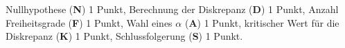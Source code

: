 \begin{bewertung}
Nullhypothese ({\bf N})  1 Punkt,
Berechnung der Diskrepanz ({\bf D}) 1 Punkt,
Anzahl Freiheitsgrade ({\bf F}) 1 Punkt,
Wahl eines $\alpha$ ({\bf A}) 1 Punkt,
kritischer Wert für  die Diskrepanz ({\bf K}) 1 Punkt,
Schlussfolgerung ({\bf S}) 1 Punkt.
\end{bewertung}



